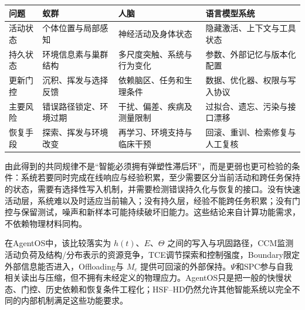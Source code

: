 \begin{table}[htbp]
\centering
\begin{tabularx}{\textwidth}{l X X X}
\toprule
\rowcolor{structurecolor!20} \textbf{问题} & \textbf{蚁群} & \textbf{人脑} & \textbf{语言模型系统} \\
\midrule
活动状态 & 个体位置与局部感知 & 神经活动及身体状态 & 隐藏激活、上下文与工具状态 \\
持久状态 & 环境信息素与巢群结构 & 多尺度突触、系统与行为变化 & 参数、外部记忆与版本化配置 \\
更新门控 & 沉积、挥发与选择反馈 & 依赖脑区、任务和生理条件 & 数据、优化器、权限与写入协议 \\
主要风险 & 错误路径锁定、环境过期 & 干扰、偏差、疾病及测量限制 & 过拟合、遗忘、污染与接口漂移 \\
恢复手段 & 探索、挥发与环境改变 & 再学习、环境支持与临床干预 & 回滚、重训、检索修复与人工复核 \\
\bottomrule
\end{tabularx}
\end{table}

由此得到的共同规律不是“智能必须拥有弹塑性滞后环”，而是更弱也更可检验的条件：系统若要同时完成在线响应与经验积累，至少需要区分当前活动和跨任务保持的状态，需要有选择性写入机制，并需要检测错误持久化与恢复的接口。没有快速活动层，系统难以及时适应当前输入；没有持久层，经验不能跨任务积累；没有门控与保留测试，噪声和新样本可能持续破坏旧能力。这些结论来自计算功能需求，不依赖物理材料同构。

在AgentOS中，该比较落实为 $h(t)$、$E$、$\Theta$ 之间的写入与巩固路径，CCM监测活动负荷及结构/分布表示的资源竞争，TCE调节探索和控制强度，Boundary限定外部信息能否进入，Offloading与 $M_e$ 提供可回滚的外部保持。$\Psi$和SPC参与自我相关读出与压缩，但不拥有未经定义的物理应力。AgentOS只是把一般的快慢状态、门控、历史依赖和恢复条件工程化；HSF--HD仍然允许其他智能系统以完全不同的内部机制满足这些功能要求。

